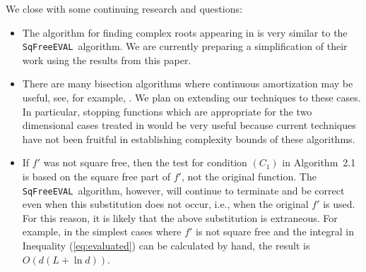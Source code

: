 \documentclass{amsart}
\theoremstyle{definition}
\newcommand{\EVAL}{\texttt{SqFreeEVAL}}
\begin{document}
We close with some continuing research and questions:
\begin{itemize}
\item The algorithm for finding complex roots appearing in \citep{sagraloff-yap:ceval:09} is very similar to the \EVAL\ algorithm. We are currently preparing a simplification of their work using the results from this paper.
\item There are many bisection algorithms where continuous amortization may be useful, see, for example, \citep{Henrici:search:70,Yakoubsohn:bisection:05,sagraloff-yap:ceval:09, plantinga-vegter:isotopic:04,plantinga:thesis:06,snyder:interval:92, galehouse:thesis,burr+3:subdiv2:10,eigenwillig-sharma-yap:descartes:06, du-sharma-yap:sturm:07,linyap2009}.  We plan on extending our techniques to these cases.  In particular, stopping functions which are appropriate for the two dimensional cases treated in \citep{plantinga-vegter:isotopic:04,plantinga:thesis:06,galehouse:thesis} would be very useful because current techniques have not been fruitful in establishing complexity bounds of these algorithms.
\item If $f'$ was not square free, then the test for condition $(C_1)$ in Algorithm~2.1 is based on the square free part of $f'$, not the original function.  The \EVAL\ algorithm, however, will continue to terminate and be correct even when this substitution does not occur, i.e., when the original $f'$ is used.  For this reason, it is likely that the above substitution is extraneous.  For example, in the simplest cases where $f'$ is not square free and the integral in Inequality (\ref{eq:evaluated}) can be calculated by hand, the result is $O(d(L+\ln d))$.
\end{itemize}



\end{document}
